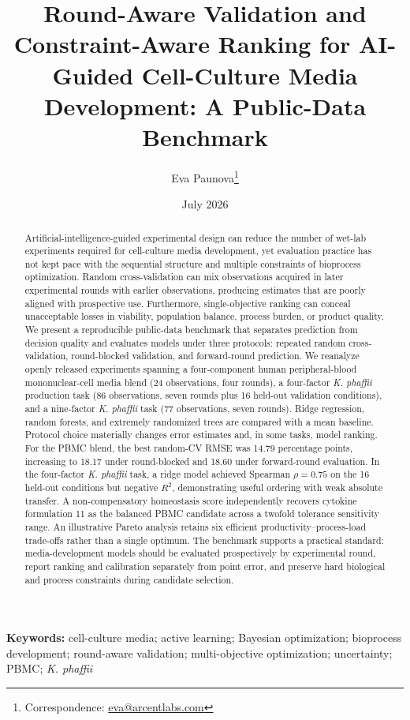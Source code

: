 \documentclass[11pt]{article}
\title{\textbf{Round-Aware Validation and Constraint-Aware Ranking for AI-Guided Cell-Culture Media Development: A Public-Data Benchmark}}
\author[1]{Eva Paunova\thanks{Correspondence: \href{mailto:eva@arcentlabs.com}{eva@arcentlabs.com}}}
\affil[1]{ArcentLabs, Europe}
\date{July 2026}
\newcommand{\kp}{\textit{K. phaffii}}
\begin{document}
\maketitle

\begin{abstract}
Artificial-intelligence-guided experimental design can reduce the number of wet-lab experiments required for cell-culture media development, yet evaluation practice has not kept pace with the sequential structure and multiple constraints of bioprocess optimization. Random cross-validation can mix observations acquired in later experimental rounds with earlier observations, producing estimates that are poorly aligned with prospective use. Furthermore, single-objective ranking can conceal unacceptable losses in viability, population balance, process burden, or product quality. We present a reproducible public-data benchmark that separates prediction from decision quality and evaluates models under three protocols: repeated random cross-validation, round-blocked validation, and forward-round prediction. We reanalyze openly released experiments spanning a four-component human peripheral-blood mononuclear-cell media blend (24 observations, four rounds), a four-factor \kp{} production task (86 observations, seven rounds plus 16 held-out validation conditions), and a nine-factor \kp{} task (77 observations, seven rounds). Ridge regression, random forests, and extremely randomized trees are compared with a mean baseline. Protocol choice materially changes error estimates and, in some tasks, model ranking. For the PBMC blend, the best random-CV RMSE was 14.79 percentage points, increasing to 18.17 under round-blocked and 18.60 under forward-round evaluation. In the four-factor \kp{} task, a ridge model achieved Spearman $\rho=0.75$ on the 16 held-out conditions but negative $R^2$, demonstrating useful ordering with weak absolute transfer. A non-compensatory homeostasis score independently recovers cytokine formulation 11 as the balanced PBMC candidate across a twofold tolerance sensitivity range. An illustrative Pareto analysis retains six efficient productivity--process-load trade-offs rather than a single optimum. The benchmark supports a practical standard: media-development models should be evaluated prospectively by experimental round, report ranking and calibration separately from point error, and preserve hard biological and process constraints during candidate selection.
\end{abstract}

\textbf{Keywords:} cell-culture media; active learning; Bayesian optimization; bioprocess development; round-aware validation; multi-objective optimization; uncertainty; PBMC; \kp{}
\end{document}
